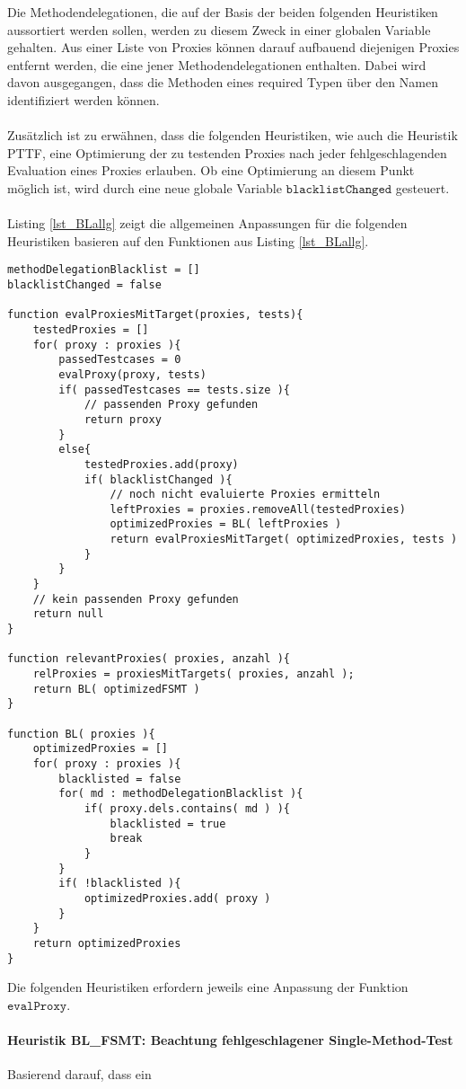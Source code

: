 \documentclass[a4paper,12pt]{article}
\begin{document}
\noindent
Die Methodendelegationen, die auf der Basis der beiden folgenden Heuristiken aussortiert werden sollen, werden zu diesem Zweck in einer globalen Variable gehalten. Aus einer Liste von Proxies können darauf aufbauend diejenigen Proxies entfernt werden, die eine jener Methodendelegationen enthalten. Dabei wird davon ausgegangen, dass die Methoden eines required Typen über den Namen identifiziert werden können.
\\\\
Zusätzlich ist zu erwähnen, dass die folgenden Heuristiken, wie auch die Heuristik PTTF, eine Optimierung der zu testenden Proxies nach jeder fehlgeschlagenden Evaluation eines Proxies erlauben. Ob eine Optimierung an diesem Punkt möglich ist, wird durch eine neue globale Variable $\texttt{blacklistChanged}$ gesteuert.
\\\\
Listing \ref{lst_BLallg} zeigt die allgemeinen Anpassungen für die folgenden Heuristiken basieren auf den Funktionen aus Listing \ref{lst_BLallg}.
\begin{lstlisting}[style = pseudo, label = lst_BLallg]
methodDelegationBlacklist = []
blacklistChanged = false

function evalProxiesMitTarget(proxies, tests){
	testedProxies = []
	for( proxy : proxies ){
		passedTestcases = 0
		evalProxy(proxy, tests)
		if( passedTestcases == tests.size ){
			// passenden Proxy gefunden
			return proxy
		}
		else{
			testedProxies.add(proxy)
			if( blacklistChanged ){
				// noch nicht evaluierte Proxies ermitteln
				leftProxies = proxies.removeAll(testedProxies)
				optimizedProxies = BL( leftProxies )	
				return evalProxiesMitTarget( optimizedProxies, tests )
			}
		}
	}
	// kein passenden Proxy gefunden
	return null
}

function relevantProxies( proxies, anzahl ){
	relProxies = proxiesMitTargets( proxies, anzahl );
	return BL( optimizedFSMT )
}  

function BL( proxies ){
	optimizedProxies = []	
	for( proxy : proxies ){
		blacklisted = false
		for( md : methodDelegationBlacklist ){
			if( proxy.dels.contains( md ) ){
				blacklisted = true
				break
			}	
		}
		if( !blacklisted ){
			optimizedProxies.add( proxy )
		}
	}
	return optimizedProxies
}

\end{lstlisting}
\noindent
Die folgenden Heuristiken erfordern jeweils eine Anpassung der Funktion $\texttt{evalProxy}$.


\paragraph{Heuristik BL\_FSMT: Beachtung fehlgeschlagener Single-Method-Test}
\noindent
\newline
Basierend darauf, dass ein 
\end{document}

